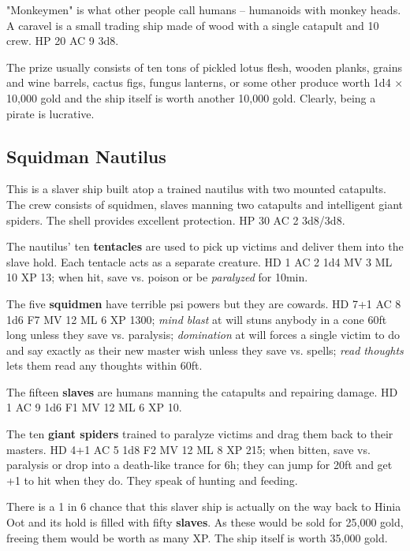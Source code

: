 \documentclass[11pt]{bxart}
\begin{document}
"Monkeymen" is what other people call humans – humanoids with monkey heads. A caravel is a small trading ship made of wood with a single catapult and 10 crew. HP 20 AC 9 3d8.

The prize usually consists of ten tons of pickled lotus flesh, wooden planks, grains and wine barrels, cactus figs, fungus lanterns, or some other produce worth 1d4 × 10,000 gold and the ship itself is worth another 10,000 gold. Clearly, being a pirate is lucrative.

\subsection{Squidman Nautilus}

This is a slaver ship built atop a trained nautilus with two mounted catapults. The crew consists of squidmen, slaves manning two catapults and intelligent giant spiders. The shell provides excellent protection. HP 30 AC 2 3d8/3d8.

The nautilus' ten \textbf{tentacles} are used to pick up victims and deliver them into the slave hold. Each tentacle acts as a separate creature. HD 1 AC 2 1d4 MV 3 ML 10 XP 13; when hit, save vs. poison or be \textit{paralyzed} for 10min.

The five \textbf{squidmen} have terrible psi powers but they are cowards. HD 7+1 AC 8 1d6 F7 MV 12 ML 6 XP 1300; \textit{mind blast} at will stuns anybody in a cone 60ft long unless they save vs. paralysis; \textit{domination} at will forces a single victim to do and say exactly as their new master wish unless they save vs. spells; \textit{read thoughts} lets them read any thoughts within 60ft.

The fifteen \textbf{slaves} are humans manning the catapults and repairing damage. HD 1 AC 9 1d6 F1 MV 12 ML 6 XP 10.

The ten \textbf{giant spiders} trained to paralyze victims and drag them back to their masters. HD 4+1 AC 5 1d8 F2 MV 12 ML 8 XP 215; when bitten, save vs. paralysis or drop into a death-like trance for 6h; they can jump for 20ft and get +1 to hit when they do. They speak of hunting and feeding.

There is a 1 in 6 chance that this slaver ship is actually on the way back to Hinia Oot and its hold is filled with fifty \textbf{slaves}. As these would be sold for 25,000 gold, freeing them would be worth as many XP. The ship itself is worth 35,000 gold.
\end{document}
